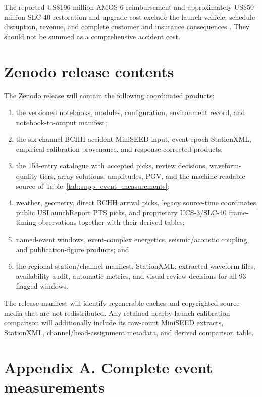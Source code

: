 \documentclass[]{seismica}
\begin{document}
The reported US\$196-million AMOS-6 reimbursement and approximately
US\$50-million SLC-40 restoration-and-upgrade cost exclude the launch vehicle,
schedule disruption, revenue, and complete customer and insurance consequences
\citep{magan_amos6_2016,clark_slc40_2017}. They should not be summed as a
comprehensive accident cost.


\section*{Zenodo release contents}

The Zenodo release will contain the following coordinated products:
\begin{enumerate}
  \item the versioned notebooks, modules, configuration, environment record,
        and notebook-to-output manifest;
  \item the six-channel BCHH accident MiniSEED input, event-epoch StationXML,
        empirical calibration provenance, and response-corrected products;
  \item the 153-entry catalogue with accepted picks, review decisions,
        waveform-quality tiers, array solutions, amplitudes, PGV, and the
        machine-readable source of Table~\ref{tab:supp_event_measurements};
  \item weather, geometry, direct BCHH arrival picks, legacy source-time coordinates, public USLaunchReport PTS picks, and proprietary UCS-3/SLC-40 frame-timing observations together with
        their derived tables;
  \item named-event windows, event-complex energetics, seismic/acoustic coupling, and
        publication-figure products; and
  \item the regional station/channel manifest, StationXML, extracted waveform
        files, availability audit, automatic metrics, and visual-review
        decisions for all 93 flagged windows.
\end{enumerate}
The release manifest will identify regenerable caches and copyrighted source
media that are not redistributed. Any retained nearby-launch calibration
comparison will additionally include its raw-count MiniSEED extracts,
StationXML, channel/head-assignment metadata, and derived comparison table.

\clearpage

\section*{Appendix A. Complete event measurements}
\label{app:supp_event_measurements}
\end{document}
